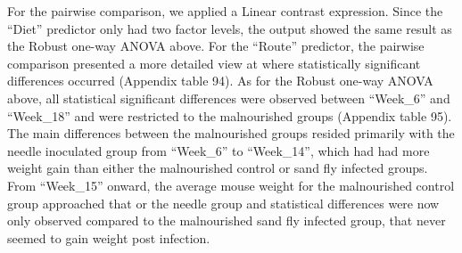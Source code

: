 \documentclass[
  12pt,
  letterpaper,
]{article}
\begin{document}
For the pairwise comparison, we applied a Linear contrast expression. Since the ``Diet'' predictor only had two factor levels, the output showed the same result as the Robust one-way ANOVA above. For the ``Route'' predictor, the pairwise comparison presented a more detailed view at where statistically significant differences occurred (Appendix table 94). As for the Robust one-way ANOVA above, all statistical significant differences were observed between ``Week\_6'' and ``Week\_18'' and were restricted to the malnourished groups (Appendix table 95). The main differences between the malnourished groups resided primarily with the needle inoculated group from ``Week\_6'' to ``Week\_14'', which had had more weight gain than either the malnourished control or sand fly infected groups. From ``Week\_15'' onward, the average mouse weight for the malnourished control group approached that or the needle group and statistical differences were now only observed compared to the malnourished sand fly infected group, that never seemed to gain weight post infection.
\end{document}
